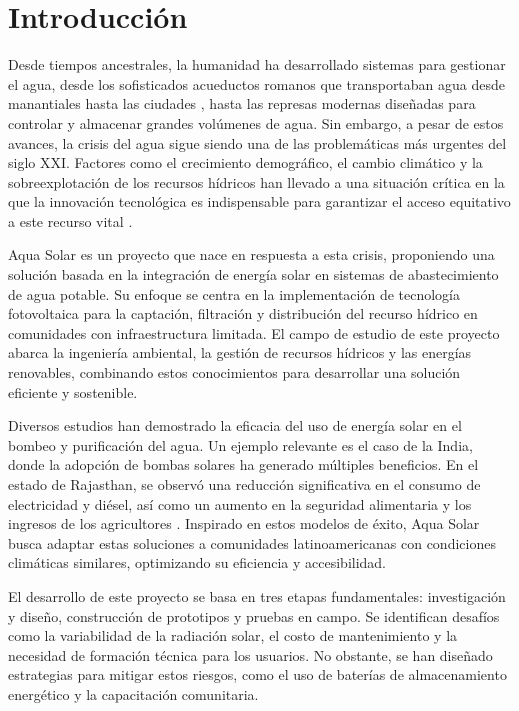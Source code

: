 \documentclass[12pt]{article}
\begin{document}
\newpage
\section{Introducción}
Desde tiempos ancestrales, la humanidad ha desarrollado sistemas para gestionar el agua, desde los sofisticados acueductos romanos que transportaban agua desde manantiales hasta las ciudades \cite{AcueductoRomano}, hasta las represas modernas diseñadas para controlar y almacenar grandes volúmenes de agua. Sin embargo, a pesar de estos avances, la crisis del agua sigue siendo una de las problemáticas más urgentes del siglo XXI. Factores como el crecimiento demográfico, el cambio climático y la sobreexplotación de los recursos hídricos han llevado a una situación crítica en la que la innovación tecnológica es indispensable para garantizar el acceso equitativo a este recurso vital \cite{ONUAgua2023, UNESCO2024}.


Aqua Solar es un proyecto que nace en respuesta a esta crisis, proponiendo una solución basada en la integración de energía solar en sistemas de abastecimiento de agua potable. Su enfoque se centra en la implementación de tecnología fotovoltaica para la captación, filtración y distribución del recurso hídrico en comunidades con infraestructura limitada. El campo de estudio de este proyecto abarca la ingeniería ambiental, la gestión de recursos hídricos y las energías renovables, combinando estos conocimientos para desarrollar una solución eficiente y sostenible.

Diversos estudios han demostrado la eficacia del uso de energía solar en el bombeo y purificación del agua. Un ejemplo relevante es el caso de la India, donde la adopción de bombas solares ha generado múltiples beneficios. En el estado de Rajasthan, se observó una reducción significativa en el consumo de electricidad y diésel, así como un aumento en la seguridad alimentaria y los ingresos de los agricultores \cite{Kishore2019}. Inspirado en estos modelos de éxito, Aqua Solar busca adaptar estas soluciones a comunidades latinoamericanas con condiciones climáticas similares, optimizando su eficiencia y accesibilidad.

El desarrollo de este proyecto se basa en tres etapas fundamentales: investigación y diseño, construcción de prototipos y pruebas en campo. Se identifican desafíos como la variabilidad de la radiación solar, el costo de mantenimiento y la necesidad de formación técnica para los usuarios. No obstante, se han diseñado estrategias para mitigar estos riesgos, como el uso de baterías de almacenamiento energético y la capacitación comunitaria.
\newpage
\end{document}
